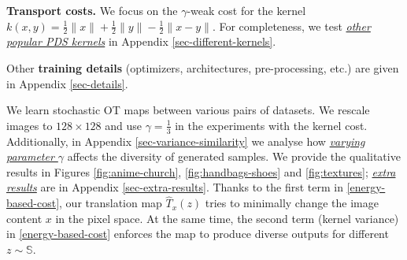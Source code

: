 \documentclass{article} %
\begin{document}
\textbf{Transport costs.} We focus on the $\gamma$-weak cost for the kernel $k(x,y)=\frac{1}{2}\|x\|+\frac{1}{2}\|y\|-\frac{1}{2}\|x-y\|$. For completeness, we test \underline{\textit{other popular PDS kernels}} in Appendix \ref{sec-different-kernels}.

Other \textbf{training details} (optimizers, architectures, pre-processing, etc.) are given in Appendix \ref{sec-details}.

We learn stochastic OT maps between various pairs of datasets. We rescale images to $128\times 128$ and use $\gamma=\frac{1}{3}$ in the experiments with the kernel cost. Additionally, in Appendix \ref{sec-variance-similarity} we analyse how \textit{\underline{varying parameter $\gamma$}}  affects the diversity of generated samples.
We provide the qualitative results in Figures \ref{fig:anime-church}, \ref{fig:handbags-shoes} and \ref{fig:textures}; \underline{\textit{extra results}} are in Appendix \ref{sec-extra-results}. Thanks to the first term in \eqref{energy-based-cost}, our translation map $\hat{T}_{x}(z)$ tries to minimally change the image content $x$ in the pixel space. At the same time, the second term (kernel variance) in \eqref{energy-based-cost} enforces the map to produce diverse outputs for different $z\sim\mathbb{S}$.
\end{document}
